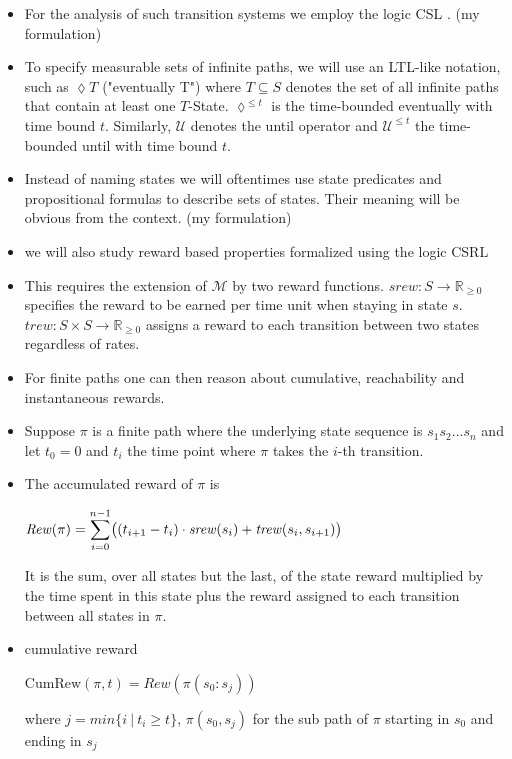 \documentclass[a4paper, 10pt]{article}
\begin{document}
\begin{itemize}
	\item For the analysis of such transition systems we employ the logic CSL \cite{assb96, bhhk00, knp07}. (my formulation)
	\item To specify measurable sets of infinite paths, we will use an LTL-like notation, such as $\lozenge T$ ("eventually T") where $T \subseteq S$ denotes the set of all infinite paths that contain at least one $T$-State. $\lozenge^{\le t}$ is the time-bounded eventually with time bound $t$. Similarly, $\mathcal{U}$ denotes the until operator and $\mathcal{U}^{\le t}$ the time-bounded until with time bound $t$.
	\item Instead of naming states we will oftentimes use state predicates and propositional formulas to describe sets of states. Their meaning will be obvious from the context. (my formulation)
	\item we will also study reward based properties formalized using the logic CSRL \cite{bhhk00, knp07}
	\item This requires the extension of $\mathcal{M}$ by two reward functions. $\mathit{srew} : S \rightarrow \mathbb{R}_{\ge 0}$ specifies the reward to be earned per time  unit when staying in state $s$. $\mathit{trew} : S \times S \rightarrow \mathbb{R}_{\ge 0}$ assigns a reward to each transition between two states regardless of rates.
	\item For finite paths one can then reason about cumulative, reachability and instantaneous rewards.
	\item Suppose $\pi$ is a finite path where the underlying state sequence is $s_1 s_2 ...s_n$ and let $t_0 = 0$ and $t_i$ the time point where $\pi$ takes the $i$-th transition.
	\item The accumulated reward of $\pi$ is
		\begin{center}
			$\mathit{Rew}(\pi) = \mathlarger{\sum}\limits_{i=0}^{n-1} \big( (t_{i+1} - t_i) \cdot \mathit{srew}(s_i) + \mathit{trew}(s_i, s_{i+1}) \big)$
		\end{center}
		It is the sum, over all states but the last, of the state reward multiplied by the time spent in this state plus the reward assigned to each transition between all states in $\pi$.
	\item cumulative reward
		\begin{center}
			$\mathrm{CumRew}(\pi, t) = \mathit{Rew}(\pi(s_0:s_j))$
		\end{center}
		where $j = min \{ i~|~t_i \ge t \}$, $\pi(s_0,s_j)$ for the sub path of $\pi$ starting in $s_0$ and ending in $s_j$

\end{itemize}
\end{document}
